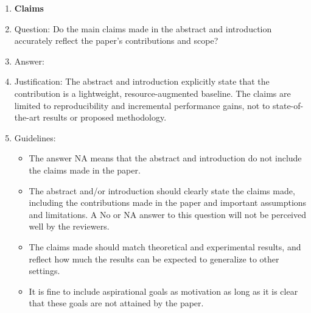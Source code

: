 \documentclass{article}
\theoremstyle{plain}
\theoremstyle{definition}
\theoremstyle{remark}
\begin{document}
	\begin{enumerate}
		
		\item {\bf Claims}
		\item[] Question: Do the main claims made in the abstract and introduction accurately reflect the paper's contributions and scope?
		\item[] Answer: \answerYes{}
		\item[] Justification: The abstract and introduction explicitly state that the contribution is a lightweight, resource-augmented baseline. The claims are limited to reproducibility and incremental performance gains, not to state-of-the-art results or proposed methodology.
		\item[] Guidelines:
		\begin{itemize}
			\item The answer NA means that the abstract and introduction do not include the claims made in the paper.
			\item The abstract and/or introduction should clearly state the claims made, including the contributions made in the paper and important assumptions and limitations. A No or NA answer to this question will not be perceived well by the reviewers. 
			\item The claims made should match theoretical and experimental results, and reflect how much the results can be expected to generalize to other settings. 
			\item It is fine to include aspirational goals as motivation as long as it is clear that these goals are not attained by the paper. 
		\end{itemize}
		

\end{enumerate}
\end{document}
